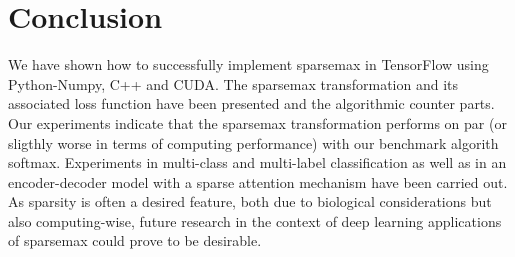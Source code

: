 \section{Conclusion}

We have shown how to successfully implement sparsemax in TensorFlow using Python-Numpy, C++ and CUDA. The sparsemax transformation and its associated loss function have been presented and the algorithmic counter parts. Our experiments indicate that the sparsemax transformation performs on par (or sligthly worse in terms of computing performance) with our benchmark algorith softmax. Experiments in multi-class and multi-label classification as well as in an encoder-decoder model with a sparse attention mechanism have been carried out. As sparsity is often a desired feature, both due to biological considerations but also computing-wise, future research in the context of deep learning applications of sparsemax could prove to be desirable.
